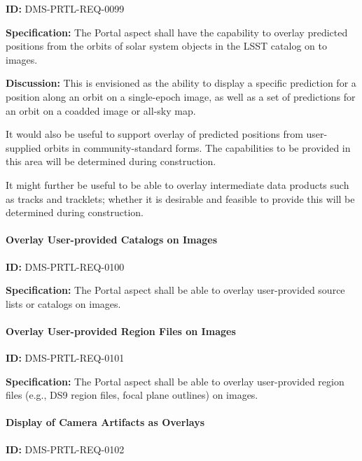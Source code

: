 \documentclass[SE,toc]{lsstdoc}
\begin{document}
\label{DMS-PRTL-REQ-0099}
\textbf{ID:} DMS-PRTL-REQ-0099

\textbf{Specification:}
The Portal aspect shall have the capability to overlay predicted positions from the orbits of 	solar system objects in the LSST catalog on to images.

\textbf{Discussion:}
This is envisioned as the ability to display a specific prediction for a position along an orbit on a single-epoch image, as well as a set of predictions for an orbit on a coadded image or all-sky map.

It would also be useful to support overlay of predicted positions from user-supplied orbits in community-standard forms.  The capabilities to be provided in this area will be determined during construction.

It might further be useful to be able to overlay intermediate data products such as tracks and tracklets; whether it is desirable and feasible to provide this will be determined during construction.

\paragraph{Overlay User-provided Catalogs on Images}\hfill  %

\label{DMS-PRTL-REQ-0100}
\textbf{ID:} DMS-PRTL-REQ-0100

\textbf{Specification:}
The Portal aspect shall be able to overlay user-provided source lists or catalogs on images.

\paragraph{Overlay User-provided Region Files on Images}\hfill  %

\label{DMS-PRTL-REQ-0101}
\textbf{ID:} DMS-PRTL-REQ-0101

\textbf{Specification:}
The Portal aspect shall be able to overlay user-provided region files (e.g., DS9 region files, focal plane outlines) on images.

\paragraph{Display of Camera Artifacts as Overlays}\hfill  %

\label{DMS-PRTL-REQ-0102}
\textbf{ID:} DMS-PRTL-REQ-0102
\end{document}

